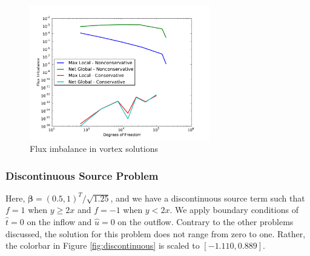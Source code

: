 \documentclass[letterpaper]{article}
\def\bbeta{\boldsymbol\beta}
\begin{document}
\begin{figure}[p]
\centering
\includegraphics[width=0.7\textwidth]{figs/Vortex/modifiedFlux.pdf}
\caption{Flux imbalance in vortex solutions}
\label{fig:vortex_flux}
\end{figure}

\subsubsection{Discontinuous Source Problem}
Here, $\bbeta=(0.5,1)^T/\sqrt{1.25}$, and we have a discontinuous source term
such that $f=1$ when $y\ge2x$ and $f=-1$ when $y<2x$. We apply boundary
conditions of $\hat t=0$ on the inflow and $\hat u=0$ on the outflow. Contrary
to the other problems discussed, the solution for this problem does not range
from zero to one. Rather, the colorbar in Figure \ref{fig:discontinuous} is
scaled to  $[-1.110,0.889]$.
\end{document}
